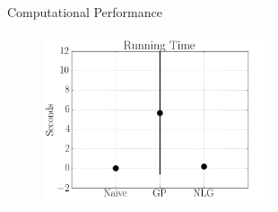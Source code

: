 \documentclass[t]{beamer} %
\begin{document}
\begin{frame}{Computational Performance}
\begin{figure}[H]
  \centering
    \includegraphics[width=0.6\textwidth]{times}
\end{figure}
\end{frame}
\end{document}

